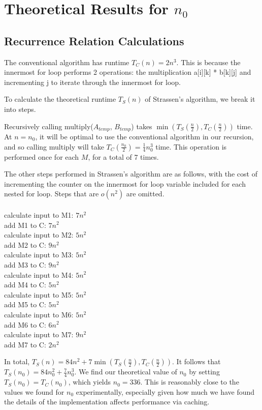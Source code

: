 \documentclass{article}
\begin{document}
\section*{Theoretical Results for $n_0$} 
\subsection*{Recurrence Relation Calculations}
The conventional algorithm has runtime $T_C (n) = 2 n^3$. This is because the innermost for loop performs 2 operations: the multiplication a[i][k] * b[k][j] and incrementing j to iterate through the innermost for loop. 

To calculate the theoretical runtime $T_S(n)$ of Strassen's algorithm, we break it into steps. 

Recursively calling multiply($A_{temp}$, $B_{temp}$) takes $\min(T_S(\frac{n}{2}), T_C(\frac{n}{2}))$ time. At $n=n_0$, it will be optimal to use the conventional algorithm in our recursion, and so calling multiply will take $T_C(\frac{n_0}{2}) = \frac{1}{4} n_0^3$ time. This operation is performed once for each $M$, for a total of 7 times. 

The other steps performed in Strassen's algorithm are as follows, with the cost of incrementing the counter on the innermost for loop variable included for each nested for loop. Steps that are $o(n^2)$ are omitted. \\\\
calculate input to M1: $7n^2$\\
add M1 to C: $7 n^2$\\
calculate input to M2: $5n^2$\\
add M2 to C: $9n^2$\\
calculate input to M3: $5n^2$\\
add M3 to C: $9 n^2$\\
calculate input to M4: $5n^2$\\
add M4 to C: $5n^2$\\
calculate input to M5: $5n^2$\\
add M5 to C: $5 n^2$\\
calculate input to M6: $5 n^2$\\
add M6 to C: $6 n^2$\\
calculate input to M7: $9 n^2$\\
add M7 to C: $2n^2$

In total, $T_S(n) = 84 n^2 + 7 \min(T_S(\frac{n}{2}), T_C(\frac{n}{2}))$. It follows that $T_S(n_0) = 84 n_0^2 + \frac{7}{4} n_0^3$. We find our theoretical value of $n_0$ by setting $T_S(n_0) = T_C (n_0)$, which yields $n_0 = 336$. This is reasonably close to the values we found for $n_0$ experimentally, especially given how much we have found the details of the implementation affects performance via caching. 
\end{document}
